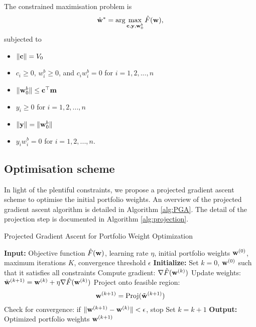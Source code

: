 \documentclass{article} %
\theoremstyle{plain}
\theoremstyle{definition} %
\begin{document}
The constrained maximisation problem is 
\begin{align}
\hat {\bf w}^* = \arg\max_{{\bf c}, {\bf y}, {\bf w}^b_0} \hat F({\bf w}),
\end{align}
subjected to 
\begin{itemize}
  \item $\|{\bf c}\| = V_0$
  \item $c_i \geq 0$, $w^b_i\geq 0$, and $c_iw^b_i = 0$ for $i=1,2,...,n$
  \item $\|{\bf w}^b_0\| \leq {\bf c}^\top {\bf m}$
  \item $y_i \geq 0$ for $i=1,2,...,n$
  \item $\|{\bf y}\| = \|{\bf w}^b_0\|$
  \item $y_iw^b_i = 0$ for $i=1,2,...,n$.
  \end{itemize}

\subsection{Optimisation scheme}
In light of the plentiful constraints, we propose a projected gradient ascent scheme to optimise the initial portfolio weights. 
 An overview of the projected gradient ascent algorithm is detailed in Algorithm \ref{alg:PGA}. 
 The detail of the projection step is documented in Algorithm \ref{alg:projection}.
\begin{algorithm}[th]
  \caption{Projected Gradient Ascent for Portfolio Weight Optimization}\label{alg:PGA}
  \begin{algorithmic}[1]
  \STATE \textbf{Input:} Objective function $\hat F({\bf w})$, learning rate $\eta$, initial portfolio weights ${\bf w}^{(0)}$, maximum iterations $K$, convergence threshold $\epsilon$
  \STATE \textbf{Initialize:} Set $k = 0$, ${\bf w}^{(0)}$ such that it satisfies all constraints
      \STATE Compute gradient: $\nabla \hat F({\bf w}^{(k)})$
      \STATE Update weights: $\tilde{\bf w}^{(k+1)} = {\bf w}^{(k)} + \eta \nabla \hat F({\bf w}^{(k)})$
      \STATE Project onto feasible region:
      \[
        {\bf w}^{(k+1)} = \text{Proj}(\tilde{\bf w}^{(k+1)})
      \]
      \STATE Check for convergence: if $\|{\bf w}^{(k+1)} - {\bf w}^{(k)} \| < \epsilon$, stop
      \STATE Set $k = k + 1$
  \ENDWHILE
  \STATE \textbf{Output:} Optimized portfolio weights ${\bf w}^{(k+1)}$
  \end{algorithmic}
  \end{algorithm}
  
\end{document}
